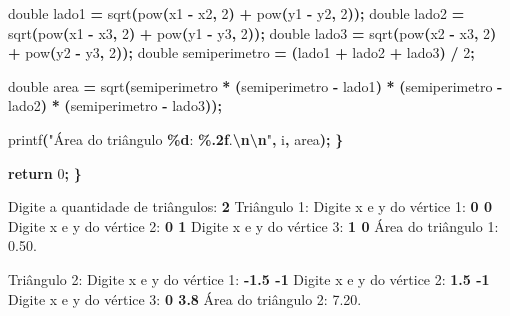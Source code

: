 \documentclass[
  11pt,
  a4paper,
]{scrbook}
\newenvironment{Shaded}{\begin{snugshade}}{\end{snugshade}}
\newcommand{\ControlFlowTok}[1]{\textcolor[rgb]{0.13,0.29,0.53}{\textbf{#1}}}
\newcommand{\DataTypeTok}[1]{\textcolor[rgb]{0.13,0.29,0.53}{#1}}
\newcommand{\DecValTok}[1]{\textcolor[rgb]{0.00,0.00,0.81}{#1}}
\newcommand{\KeywordTok}[1]{\textcolor[rgb]{0.13,0.29,0.53}{\textbf{#1}}}
\newcommand{\NormalTok}[1]{#1}
\newcommand{\OperatorTok}[1]{\textcolor[rgb]{0.81,0.36,0.00}{\textbf{#1}}}
\newcommand{\SpecialCharTok}[1]{\textcolor[rgb]{0.81,0.36,0.00}{\textbf{#1}}}
\newcommand{\StringTok}[1]{\textcolor[rgb]{0.31,0.60,0.02}{#1}}
\begin{document}
\begin{Shaded}
\begin{Highlighting}[]
        \DataTypeTok{double}\NormalTok{ lado1 }\OperatorTok{=}\NormalTok{ sqrt}\OperatorTok{(}\NormalTok{pow}\OperatorTok{(}\NormalTok{x1 }\OperatorTok{{-}}\NormalTok{ x2}\OperatorTok{,} \DecValTok{2}\OperatorTok{)} \OperatorTok{+}\NormalTok{ pow}\OperatorTok{(}\NormalTok{y1 }\OperatorTok{{-}}\NormalTok{ y2}\OperatorTok{,} \DecValTok{2}\OperatorTok{));}
        \DataTypeTok{double}\NormalTok{ lado2 }\OperatorTok{=}\NormalTok{ sqrt}\OperatorTok{(}\NormalTok{pow}\OperatorTok{(}\NormalTok{x1 }\OperatorTok{{-}}\NormalTok{ x3}\OperatorTok{,} \DecValTok{2}\OperatorTok{)} \OperatorTok{+}\NormalTok{ pow}\OperatorTok{(}\NormalTok{y1 }\OperatorTok{{-}}\NormalTok{ y3}\OperatorTok{,} \DecValTok{2}\OperatorTok{));}
        \DataTypeTok{double}\NormalTok{ lado3 }\OperatorTok{=}\NormalTok{ sqrt}\OperatorTok{(}\NormalTok{pow}\OperatorTok{(}\NormalTok{x2 }\OperatorTok{{-}}\NormalTok{ x3}\OperatorTok{,} \DecValTok{2}\OperatorTok{)} \OperatorTok{+}\NormalTok{ pow}\OperatorTok{(}\NormalTok{y2 }\OperatorTok{{-}}\NormalTok{ y3}\OperatorTok{,} \DecValTok{2}\OperatorTok{));}
        \DataTypeTok{double}\NormalTok{ semiperimetro }\OperatorTok{=} \OperatorTok{(}\NormalTok{lado1 }\OperatorTok{+}\NormalTok{ lado2 }\OperatorTok{+}\NormalTok{ lado3}\OperatorTok{)} \OperatorTok{/} \DecValTok{2}\OperatorTok{;}

        \DataTypeTok{double}\NormalTok{ area }\OperatorTok{=}\NormalTok{ sqrt}\OperatorTok{(}\NormalTok{semiperimetro }\OperatorTok{*} \OperatorTok{(}\NormalTok{semiperimetro }\OperatorTok{{-}}\NormalTok{ lado1}\OperatorTok{)} \OperatorTok{*}
                           \OperatorTok{(}\NormalTok{semiperimetro }\OperatorTok{{-}}\NormalTok{ lado2}\OperatorTok{)} \OperatorTok{*} \OperatorTok{(}\NormalTok{semiperimetro }\OperatorTok{{-}}\NormalTok{ lado3}\OperatorTok{));}

\NormalTok{        printf}\OperatorTok{(}\StringTok{"Área do triângulo }\SpecialCharTok{\%d}\StringTok{: }\SpecialCharTok{\%.2f}\StringTok{.}\SpecialCharTok{\textbackslash{}n\textbackslash{}n}\StringTok{"}\OperatorTok{,}\NormalTok{ i}\OperatorTok{,}\NormalTok{ area}\OperatorTok{);}
    \OperatorTok{\}}

    \ControlFlowTok{return} \DecValTok{0}\OperatorTok{;}
\OperatorTok{\}}
\end{Highlighting}
\end{Shaded}

\begin{Shaded}
\begin{Highlighting}[]
\NormalTok{Digite a quantidade de triângulos: }\KeywordTok{ 2 }
\NormalTok{Triângulo 1:}
\NormalTok{Digite x e y do vértice 1: }\KeywordTok{ 0 0 }
\NormalTok{Digite x e y do vértice 2: }\KeywordTok{ 0 1 }
\NormalTok{Digite x e y do vértice 3: }\KeywordTok{ 1 0 }
\NormalTok{Área do triângulo 1: 0.50.}

\NormalTok{Triângulo 2:}
\NormalTok{Digite x e y do vértice 1: }\KeywordTok{ {-}1.5 {-}1 }
\NormalTok{Digite x e y do vértice 2: }\KeywordTok{ 1.5 {-}1 }
\NormalTok{Digite x e y do vértice 3: }\KeywordTok{ 0 3.8 }
\NormalTok{Área do triângulo 2: 7.20.}
\end{Highlighting}
\end{Shaded}
\end{document}
